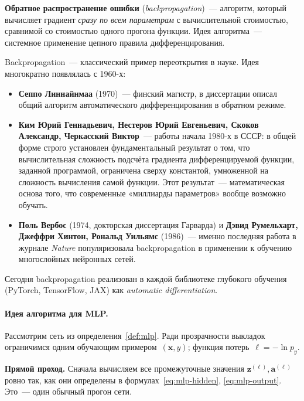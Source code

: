 \textbf{Обратное распространение ошибки} (\emph{backpropagation})~---
алгоритм, который вычисляет градиент \emph{сразу по всем параметрам} с
вычислительной стоимостью, сравнимой со стоимостью одного прогона
функции. Идея алгоритма~--- системное применение цепного правила
дифференцирования.

\begin{historybox}
Backpropagation~--- классический пример переоткрытия в науке. Идея
многократно появлялась с 1960-х:
\begin{itemize}\itemsep1pt
  \item \textbf{Сеппо Линнайнмаа} (1970)~--- финский магистр, в
        диссертации описал общий алгоритм
        автоматического дифференцирования в обратном режиме.
  \item \textbf{Ким Юрий Геннадьевич, Нестеров Юрий Евгеньевич,
        Скоков Александр, Черкасский Виктор}~--- работы начала 1980-х в
        СССР: в общей форме строго установлен фундаментальный
        результат о том, что вычислительная сложность подсчёта
        градиента дифференцируемой функции, заданной программой,
        ограничена сверху константой, умноженной на сложность
        вычисления самой функции. Этот результат~--- математическая
        основа того, что современные «миллиарды параметров» вообще
        возможно обучать.
  \item \textbf{Поль Вербос} (1974, докторская диссертация Гарварда) и
        \textbf{Дэвид Румельхарт, Джеффри Хинтон, Рональд Уильямс}
        (1986)~--- именно последняя работа в журнале \emph{Nature}
        популяризовала backpropagation в применении к обучению
        многослойных нейронных сетей.
\end{itemize}
Сегодня backpropagation реализован в каждой библиотеке глубокого
обучения (PyTorch, TensorFlow, JAX) как \emph{automatic differentiation}.
\end{historybox}

\paragraph{Идея алгоритма для MLP.}

Рассмотрим сеть из определения~\ref{def:mlp}. Ради прозрачности
выкладок ограничимся одним обучающим примером~$(\mathbf x,y)$;
функция потерь~$\ell=-\ln p_y$.

\textbf{Прямой проход.} Сначала вычисляем все промежуточные значения
$\mathbf z^{(\ell)},\mathbf a^{(\ell)}$ ровно так, как они определены в
формулах~\eqref{eq:mlp-hidden}, \eqref{eq:mlp-output}. Это~--- один
обычный прогон сети.

